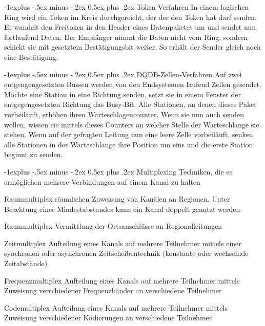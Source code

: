 \documentclass[10pt,landscape]{article}
\makeatletter
\renewcommand{\subsection}{\@startsection{subsection}{2}{0mm}%
                                {-1explus -.5ex minus -.2ex}%
                                {0.5ex plus .2ex}%
                                {\normalfont\normalsize\bfseries}}
\makeatother
\begin{document}
\begin{multicols}{3}
    \subsection{Token Verfahren}
    In einem logischen Ring wird ein Token im Kreis durchgereicht, der der den Token hat darf senden. Er wandelt den Freitoken in den Header eines Datenpaketes um und sendet nun fortlaufend Daten. Der Empfänger nimmt die Daten nicht vom Ring, sondern schickt sie mit gesetztem Bestätigungsbit weiter. So erhält der Sender gleich noch eine Bestätigung.
    
    \subsection{DQDB-Zellen-Verfahren}
    Auf zwei entgengengesetzten Bussen werden von den Endsystemen laufend Zellen gesendet. Möchte eine Station in eine Richtung senden, setzt sie in einem Fenster der entgegengesetzten Richtung das Busy-Bit. Alle Stationen, an denen dieses Paket vorbeiläuft, erhöhen ihren Warteschlagencounter. Wenn sie nun auch senden wollen, wissen sie mittels dieses Counters an welcher Stelle der Warteschlange sie stehen. Wenn auf der gefragten Leitung nun eine leere Zelle vorbeiläuft, senken alle Stationen in der Warteschlange ihre Position um eins und die erste Station beginnt zu senden.
    
    \subsection{Multiplexing}
    Techniken, die es ermöglichen mehrere Verbindungen auf einem Kanal zu halten
    \begin{description*}
        \item[Raummultiplex] räumlichen Zuweisung von Kanälen an Regionen. Unter Beachtung eines Mindestabstandes kann ein Kanal doppelt genutzt werden
        \item[Raummultiplex] Vermittlung der Ortsanschlüsse an Regionalleitungen
        \item[Zeitmultiplex] Aufteilung eines Kanals auf mehrere Teilnehmer mittels einer synchronen oder asynchronen Zeitscheibentechnik (konstante oder wechselnde Zeitabstände)
        \item[Frequenzmultiplex] Aufteilung eines Kanals auf mehrere Teilnehmer mittels Zuweisung verschiedener Frequenzbänder an verschiedene Teilnehmer
        \item[Codemultiplex] Aufteilung eines Kanals auf mehrere Teilnehmer mittels Zuweisung verschiedener Kodierungen an verschiedene Teilnehmer
    \end{description*}
    

\end{multicols}
\end{document}
